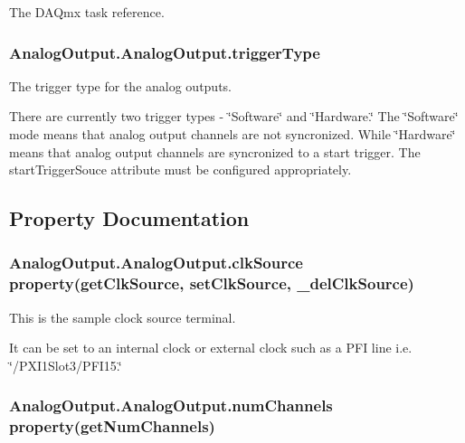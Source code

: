 The D\-A\-Qmx task reference. 

\hypertarget{class_analog_output_1_1_analog_output_a760ab1469dad131efc3a61354dd59db3}{
\subsubsection[{trigger\-Type}]{\setlength{\rightskip}{0pt plus 5cm}Analog\-Output.\-Analog\-Output.\-trigger\-Type}}\label{class_analog_output_1_1_analog_output_a760ab1469dad131efc3a61354dd59db3}


The trigger type for the analog outputs. 

There are currently two trigger types -\/ \char`\"{}\-Software\char`\"{} and \char`\"{}\-Hardware.\char`\"{} The \char`\"{}\-Software\char`\"{} mode means that analog output channels are not syncronized. While \char`\"{}\-Hardware\char`\"{} means that analog output channels are syncronized to a start trigger. The start\-Trigger\-Souce attribute must be configured appropriately. 

\subsection{Property Documentation}
\hypertarget{class_analog_output_1_1_analog_output_ab35cc7e572968599d8f2fc4df8e3d7e2}{
\subsubsection[{clk\-Source}]{\setlength{\rightskip}{0pt plus 5cm}Analog\-Output.\-Analog\-Output.\-clk\-Source property({\bf get\-Clk\-Source}, {\bf set\-Clk\-Source}, \-\_\-del\-Clk\-Source)\hspace{0.3cm}{\ttfamily [static]}}}\label{class_analog_output_1_1_analog_output_ab35cc7e572968599d8f2fc4df8e3d7e2}


This is the sample clock source terminal. 

It can be set to an internal clock or external clock such as a P\-F\-I line i.\-e. \char`\"{}/\-P\-X\-I1\-Slot3/\-P\-F\-I15.\char`\"{} \hypertarget{class_analog_output_1_1_analog_output_a0ca884b5b69a1e37758b6ea74f5e2b6f}{
\subsubsection[{num\-Channels}]{\setlength{\rightskip}{0pt plus 5cm}Analog\-Output.\-Analog\-Output.\-num\-Channels property({\bf get\-Num\-Channels})\hspace{0.3cm}{\ttfamily [static]}}}\label{class_analog_output_1_1_analog_output_a0ca884b5b69a1e37758b6ea74f5e2b6f}


